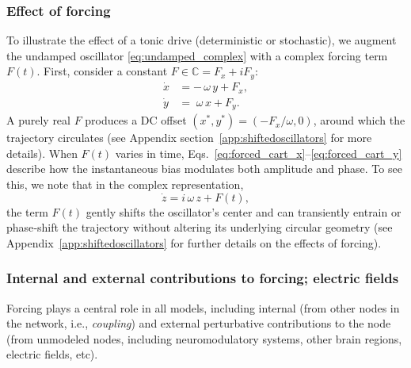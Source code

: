 \documentclass[12pt]{article}
\numberwithin{equation}{section}
\begin{document}
\subsubsection{Effect of forcing}

To illustrate the effect of a tonic drive (deterministic or stochastic), we augment the undamped oscillator \eqref{eq:undamped_complex}
with a complex forcing term \(F(t)\). First, consider a constant \(F\in\mathbb{C}=F_x+iF_y\):
\begin{align}
\dot x &= -\,\omega\,y + F_x,
\label{eq:forced_cart_x}\\
\dot y &= \;\omega\,x + F_y.
\label{eq:forced_cart_y}
\end{align}
A purely real \(F\) produces a DC offset \((x^*,y^*) = (-F_x/\omega,0)\), around which the trajectory circulates (see Appendix section~\ref{app:shiftedoscillators} for more details). When \(F(t)\) varies in time, Eqs.~\eqref{eq:forced_cart_x}–\eqref{eq:forced_cart_y} describe how the instantaneous bias modulates both amplitude and phase.
To see this, we note that in the complex representation,
\begin{equation}
\dot z = i\,\omega\,z + F(t),
\label{eq:forced_time_complex}
\end{equation}
the term \(F(t)\) gently shifts the oscillator’s center and can transiently entrain or phase‐shift the trajectory without altering its underlying circular geometry (see Appendix~\ref{app:shiftedoscillators} for further details on the effects of forcing).

\subsubsection{Internal and external contributions to forcing; electric fields}
Forcing plays a central role in all models, including internal (from other nodes in the network, i.e., \textit{coupling}) and external perturbative contributions to the node (from unmodeled nodes, including neuromodulatory systems, other brain regions, electric fields, etc).   

\end{document}
